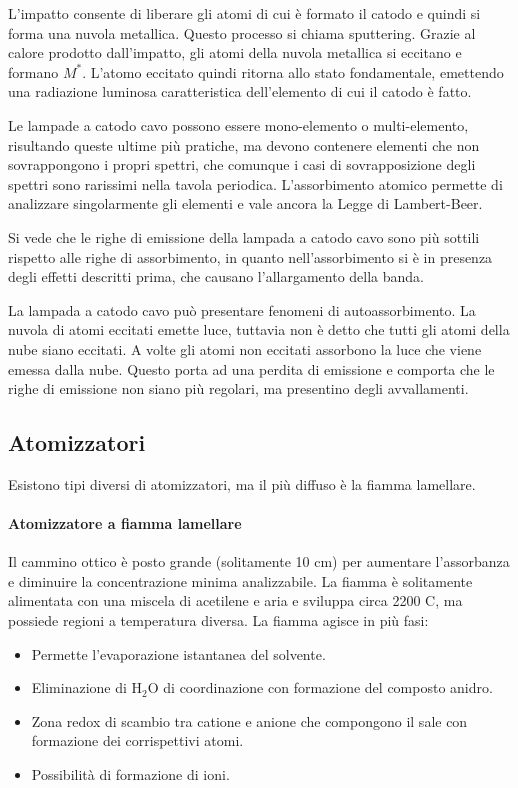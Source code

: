 
L'impatto consente di liberare gli atomi di cui è formato il catodo e quindi si forma una nuvola metallica. Questo processo si chiama sputtering.
Grazie al calore prodotto dall'impatto, gli atomi della nuvola metallica si eccitano e formano $M^\ast$.
L'atomo eccitato quindi ritorna allo stato fondamentale, emettendo una radiazione luminosa caratteristica dell'elemento di cui il catodo è fatto.

Le lampade a catodo cavo possono essere mono-elemento o multi-elemento, risultando queste ultime più pratiche, ma devono contenere elementi che non sovrappongono i propri spettri, che comunque i casi di
sovrapposizione degli spettri sono rarissimi nella tavola periodica.
L'assorbimento atomico permette di analizzare singolarmente gli elementi e vale ancora la Legge di Lambert-Beer.

Si vede che le righe di emissione della lampada a catodo cavo sono più sottili rispetto alle righe di assorbimento, in quanto nell'assorbimento si è in presenza degli effetti descritti prima, che causano l'allargamento della banda.


La lampada a catodo cavo può presentare fenomeni di autoassorbimento.
La nuvola di atomi eccitati emette luce, tuttavia non è detto che tutti gli atomi della nube siano eccitati.
A volte gli atomi non eccitati assorbono la luce che viene emessa dalla nube.
Questo porta ad una perdita di emissione e comporta che le righe di emissione non siano più regolari, ma presentino degli avvallamenti.

\subsection{Atomizzatori}
Esistono tipi diversi di atomizzatori, ma il più diffuso è la fiamma lamellare.

\paragraph{Atomizzatore a fiamma lamellare}
Il cammino ottico è posto grande (solitamente 10 cm) per aumentare l’assorbanza e diminuire la concentrazione minima analizzabile.
La fiamma è solitamente alimentata con una miscela di acetilene e aria e sviluppa circa 2200 \degree C, ma possiede regioni a temperatura diversa.
La fiamma agisce in più fasi:
\begin{itemize}
\item Permette l'evaporazione istantanea del solvente.
\item Eliminazione di H$_2$O di coordinazione con formazione del composto anidro.
\item Zona redox di scambio tra catione e anione che compongono il sale con formazione dei corrispettivi atomi.
\item Possibilità di formazione di ioni.
\end{itemize}

